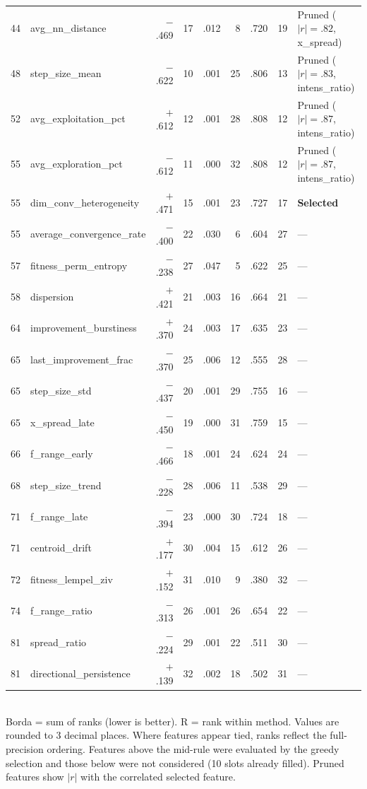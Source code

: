\begin{table}[p]
\begin{tabular}{@{}rlrrrrrrl@{}}
44 & avg\_nn\_distance             & $-$.469 & 17 & .012 &  8 & .720 & 19 & Pruned ($|r|{=}.82$, x\_spread) \\
48 & step\_size\_mean              & $-$.622 & 10 & .001 & 25 & .806 & 13 & Pruned ($|r|{=}.83$, intens\_ratio) \\
52 & avg\_exploitation\_pct        & $+$.612 & 12 & .001 & 28 & .808 & 12 & Pruned ($|r|{=}.87$, intens\_ratio) \\
55 & avg\_exploration\_pct         & $-$.612 & 11 & .000 & 32 & .808 & 12 & Pruned ($|r|{=}.87$, intens\_ratio) \\
55 & dim\_conv\_heterogeneity      & $+$.471 & 15 & .001 & 23 & .727 & 17 & \textbf{Selected} \\
\midrule
55 & average\_convergence\_rate    & $-$.400 & 22 & .030 &  6 & .604 & 27 & --- \\
57 & fitness\_perm\_entropy        & $-$.238 & 27 & .047 &  5 & .622 & 25 & --- \\
58 & dispersion                    & $+$.421 & 21 & .003 & 16 & .664 & 21 & --- \\
64 & improvement\_burstiness       & $+$.370 & 24 & .003 & 17 & .635 & 23 & --- \\
65 & last\_improvement\_frac       & $-$.370 & 25 & .006 & 12 & .555 & 28 & --- \\
65 & step\_size\_std               & $-$.437 & 20 & .001 & 29 & .755 & 16 & --- \\
65 & x\_spread\_late               & $-$.450 & 19 & .000 & 31 & .759 & 15 & --- \\
66 & f\_range\_early               & $-$.466 & 18 & .001 & 24 & .624 & 24 & --- \\
68 & step\_size\_trend             & $-$.228 & 28 & .006 & 11 & .538 & 29 & --- \\
71 & f\_range\_late                & $-$.394 & 23 & .000 & 30 & .724 & 18 & --- \\
71 & centroid\_drift               & $+$.177 & 30 & .004 & 15 & .612 & 26 & --- \\
72 & fitness\_lempel\_ziv          & $+$.152 & 31 & .010 &  9 & .380 & 32 & --- \\
74 & f\_range\_ratio               & $-$.313 & 26 & .001 & 26 & .654 & 22 & --- \\
81 & spread\_ratio                 & $-$.224 & 29 & .001 & 22 & .511 & 30 & --- \\
81 & directional\_persistence      & $+$.139 & 32 & .002 & 18 & .502 & 31 & --- \\
\bottomrule
\end{tabular}
\\[0.3em]
{\scriptsize Borda = sum of ranks (lower is better). R = rank within method. Values are rounded to 3 decimal places. Where features appear tied, ranks reflect the full-precision ordering. Features above the mid-rule were evaluated by the greedy selection and those below were not considered (10 slots already filled). Pruned features show $|r|$ with the correlated selected feature.}
\end{table}

